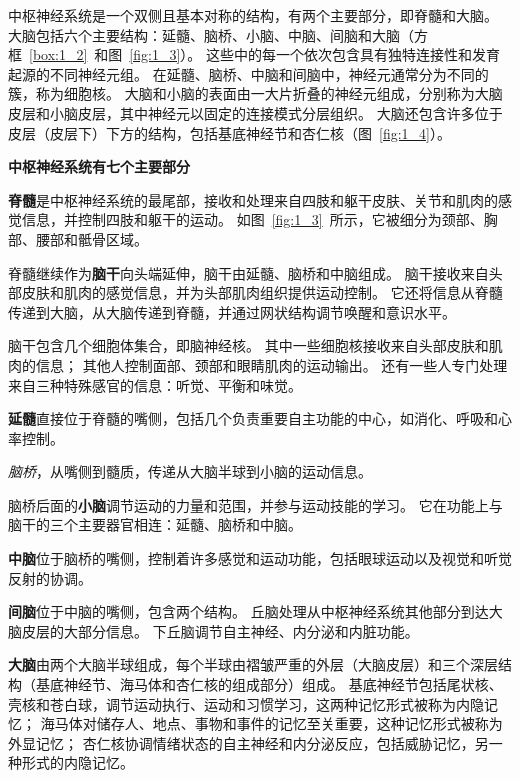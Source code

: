 中枢神经系统是一个双侧且基本对称的结构，有两个主要部分，即脊髓和大脑。
大脑包括六个主要结构：延髓、脑桥、小脑、中脑、间脑和大脑（方框~\ref{box:1_2}~和图~\ref{fig:1_3}）。
这些中的每一个依次包含具有独特连接性和发育起源的不同神经元组。
在延髓、脑桥、中脑和间脑中，神经元通常分为不同的簇，称为细胞核。
大脑和小脑的表面由一大片折叠的神经元组成，分别称为大脑皮层和小脑皮层，其中神经元以固定的连接模式分层组织。
大脑还包含许多位于皮层（皮层下）下方的结构，包括基底神经节和杏仁核（图~\ref{fig:1_4}）。


\begin{proposition}[中枢神经系统的解剖学组织] \label{box:1_2}
	\textbf{中枢神经系统有七个主要部分}
	
	\quad \quad \textbf{脊髓}是中枢神经系统的最尾部，接收和处理来自四肢和躯干皮肤、关节和肌肉的感觉信息，并控制四肢和躯干的运动。
	如图~\ref{fig:1_3}~所示，它被细分为颈部、胸部、腰部和骶骨区域。
	
	\quad \quad 脊髓继续作为\textbf{脑干}向头端延伸，脑干由延髓、脑桥和中脑组成。
	脑干接收来自头部皮肤和肌肉的感觉信息，并为头部肌肉组织提供运动控制。
	它还将信息从脊髓传递到大脑，从大脑传递到脊髓，并通过网状结构调节唤醒和意识水平。
	
	\quad \quad 脑干包含几个细胞体集合，即脑神经核。
	其中一些细胞核接收来自头部皮肤和肌肉的信息；
	其他人控制面部、颈部和眼睛肌肉的运动输出。
	还有一些人专门处理来自三种特殊感官的信息：听觉、平衡和味觉。
	
	\quad \quad \textbf{延髓}直接位于脊髓的嘴侧，包括几个负责重要自主功能的中心，如消化、呼吸和心率控制。
	
	\quad \quad \textit{脑桥}，从嘴侧到髓质，传递从大脑半球到小脑的运动信息。
	
	\quad \quad 脑桥后面的\textbf{小脑}调节运动的力量和范围，并参与运动技能的学习。
	它在功能上与脑干的三个主要器官相连：延髓、脑桥和中脑。
	
	\quad \quad \textbf{中脑}位于脑桥的嘴侧，控制着许多感觉和运动功能，包括眼球运动以及视觉和听觉反射的协调。
	
	\quad \quad \textbf{间脑}位于中脑的嘴侧，包含两个结构。
	丘脑处理从中枢神经系统其他部分到达大脑皮层的大部分信息。
	下丘脑调节自主神经、内分泌和内脏功能。
	
	\quad \quad \textbf{大脑}由两个大脑半球组成，每个半球由褶皱严重的外层（大脑皮层）和三个深层结构（基底神经节、海马体和杏仁核的组成部分）组成。
	基底神经节包括尾状核、壳核和苍白球，调节运动执行、运动和习惯学习，这两种记忆形式被称为内隐记忆；
	海马体对储存人、地点、事物和事件的记忆至关重要，这种记忆形式被称为外显记忆；
	杏仁核协调情绪状态的自主神经和内分泌反应，包括威胁记忆，另一种形式的内隐记忆。
	

\end{proposition}
